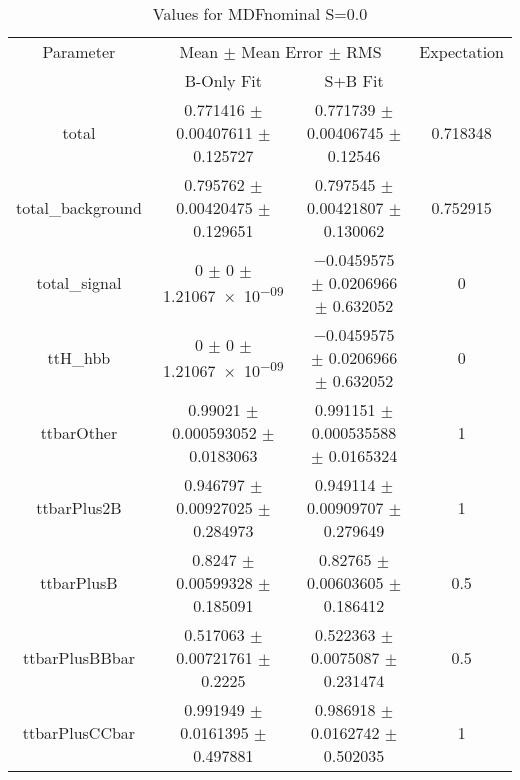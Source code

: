 \begin{table}
\centering
\caption{Values for MDFnominal S=0.0}
\begin{tabular}{cccc}
\toprule
Parameter & \multicolumn{2}{c}{Mean $\pm$ Mean Error $\pm$ RMS} & Expectation\\
 & B-Only Fit & S+B Fit & \\
\midrule
total & \num{0.771416} $\pm$ \num{0.00407611} $\pm$ \num{0.125727} & \num{0.771739} $\pm$ \num{0.00406745} $\pm$ \num{0.12546} & \num{0.718348}\\
total\_background & \num{0.795762} $\pm$ \num{0.00420475} $\pm$ \num{0.129651} & \num{0.797545} $\pm$ \num{0.00421807} $\pm$ \num{0.130062} & \num{0.752915}\\
total\_signal & \num{0} $\pm$ \num{0} $\pm$ \num{1.21067e-09} & \num{-0.0459575} $\pm$ \num{0.0206966} $\pm$ \num{0.632052} & \num{0}\\
ttH\_hbb & \num{0} $\pm$ \num{0} $\pm$ \num{1.21067e-09} & \num{-0.0459575} $\pm$ \num{0.0206966} $\pm$ \num{0.632052} & \num{0}\\
ttbarOther & \num{0.99021} $\pm$ \num{0.000593052} $\pm$ \num{0.0183063} & \num{0.991151} $\pm$ \num{0.000535588} $\pm$ \num{0.0165324} & \num{1}\\
ttbarPlus2B & \num{0.946797} $\pm$ \num{0.00927025} $\pm$ \num{0.284973} & \num{0.949114} $\pm$ \num{0.00909707} $\pm$ \num{0.279649} & \num{1}\\
ttbarPlusB & \num{0.8247} $\pm$ \num{0.00599328} $\pm$ \num{0.185091} & \num{0.82765} $\pm$ \num{0.00603605} $\pm$ \num{0.186412} & \num{0.5}\\
ttbarPlusBBbar & \num{0.517063} $\pm$ \num{0.00721761} $\pm$ \num{0.2225} & \num{0.522363} $\pm$ \num{0.0075087} $\pm$ \num{0.231474} & \num{0.5}\\
ttbarPlusCCbar & \num{0.991949} $\pm$ \num{0.0161395} $\pm$ \num{0.497881} & \num{0.986918} $\pm$ \num{0.0162742} $\pm$ \num{0.502035} & \num{1}\\
\bottomrule
\end{tabular}
\end{table}